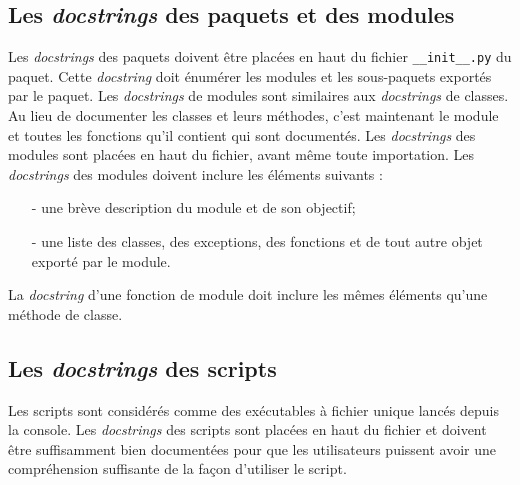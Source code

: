 \documentclass[a4paper,11pt]{book}
\begin{document}
\subsection*{Les \textit{docstrings} des paquets et des modules}
Les \textit{docstrings} des paquets doivent être placées en haut du fichier \texttt{\_\_init\_\_.py} du paquet. Cette \textit{docstring} doit énumérer les modules et les sous-paquets exportés par le paquet. Les \textit{docstrings} de modules sont similaires aux \textit{docstrings} de classes. Au lieu de documenter les classes et leurs méthodes, c'est maintenant le module et toutes les fonctions qu'il contient qui sont documentés. Les \textit{docstrings} des modules sont placées en haut du fichier, avant même toute importation. Les \textit{docstrings} des modules doivent inclure les éléments suivants :
\begin{itemize}
	\item[-] une brève description du module et de son objectif;
	\item[-] une liste des classes, des exceptions, des fonctions et de tout autre objet exporté par le module.
\end{itemize}
\medskip

La \textit{docstring} d'une fonction de module doit inclure les mêmes éléments qu'une méthode de classe.
\medskip

\subsection*{Les \textit{docstrings} des scripts}
Les scripts sont considérés comme des exécutables à fichier unique lancés depuis la console. Les \textit{docstrings} des scripts sont placées en haut du fichier et doivent être suffisamment bien documentées pour que les utilisateurs puissent avoir une compréhension suffisante de la façon d'utiliser le script.
\medskip
\end{document}
